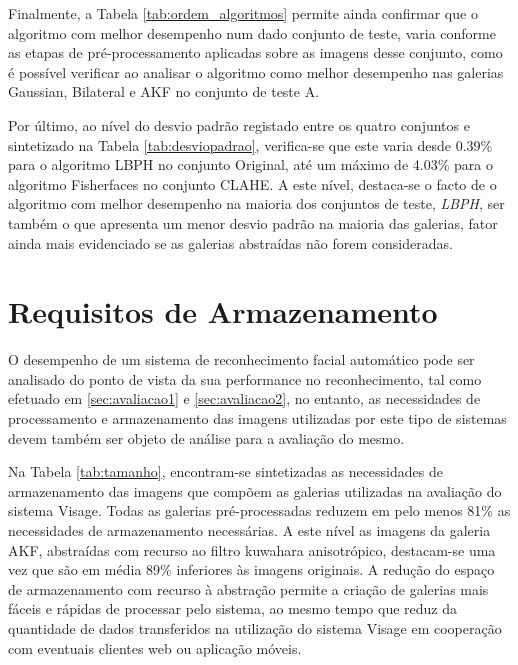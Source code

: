 Finalmente, a Tabela \ref{tab:ordem_algoritmos} permite ainda confirmar que o algoritmo com melhor desempenho num dado conjunto de teste, varia conforme as etapas de pré-processamento aplicadas sobre as imagens desse conjunto, como é possível verificar ao analisar o algoritmo como melhor desempenho nas galerias Gaussian, Bilateral e AKF no conjunto de teste A.

Por último, ao nível do desvio padrão registado entre os quatro conjuntos e sintetizado na Tabela \ref{tab:desviopadrao},  verifica-se que este varia desde 0.39\% para o algoritmo LBPH no conjunto Original, até um máximo de 4.03\%  para o algoritmo Fisherfaces no conjunto CLAHE. A este nível, destaca-se o facto de o algoritmo com melhor desempenho na maioria dos conjuntos de teste, \textit{LBPH}, ser também o que apresenta um menor desvio padrão na maioria das galerias, fator ainda mais evidenciado se as galerias abstraídas não forem consideradas.

\section{Requisitos de Armazenamento} \label{sec:armazenamento}
O desempenho de um sistema de reconhecimento facial automático pode ser analisado do ponto de vista da sua performance no reconhecimento, tal como efetuado em \ref{sec:avaliacao1} e \ref{sec:avaliacao2}, no entanto, as necessidades de processamento e armazenamento das imagens utilizadas por este tipo de sistemas devem também ser objeto de análise para a avaliação do mesmo. 

Na Tabela \ref{tab:tamanho}, encontram-se sintetizadas as necessidades de armazenamento das imagens que compõem as galerias utilizadas na avaliação do sistema Visage. Todas as galerias pré-processadas reduzem em pelo menos 81\% as necessidades de armazenamento necessárias. A este nível as imagens da galeria AKF, abstraídas com recurso ao filtro kuwahara anisotrópico, destacam-se uma vez que são em média 89\% inferiores às imagens originais. A redução do espaço de armazenamento com recurso à abstração permite a criação de galerias mais fáceis e rápidas de processar pelo sistema, ao mesmo tempo que reduz da quantidade de dados transferidos na utilização do sistema Visage em cooperação com eventuais clientes web ou aplicação móveis.

